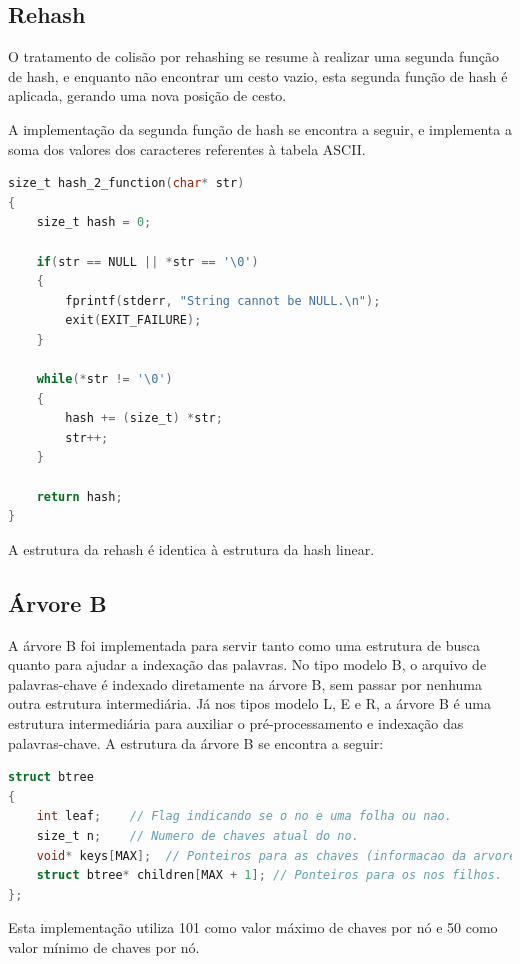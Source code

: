 \documentclass[a4paper,12pt]{article}
\begin{document}
\subsection{Rehash}
O tratamento de colisão por rehashing se resume à realizar uma segunda função de hash, e enquanto não encontrar um cesto vazio, 
esta segunda função de hash é aplicada, gerando uma nova posição de cesto.

A implementação da segunda função de hash se encontra a seguir, e implementa a soma dos valores dos caracteres referentes à tabela ASCII.

\begin{lstlisting}[language=C, caption=Segunda função de Hash]
size_t hash_2_function(char* str)
{
	size_t hash = 0;

	if(str == NULL || *str == '\0')
	{
		fprintf(stderr, "String cannot be NULL.\n");
		exit(EXIT_FAILURE);
	}

	while(*str != '\0')
	{
		hash += (size_t) *str;
		str++;
	}

	return hash;
}
\end{lstlisting}


A estrutura da rehash é identica à estrutura da hash linear.



\subsection{Árvore B}

A árvore B foi implementada para servir tanto como uma estrutura de busca quanto para ajudar a indexação das palavras.
No tipo modelo B, o arquivo de palavras-chave é indexado diretamente na árvore B, sem passar por nenhuma outra estrutura intermediária.
Já nos tipos modelo L, E e R, a árvore B é uma estrutura intermediária para auxiliar o pré-processamento e indexação das palavras-chave.
A estrutura da árvore B se encontra a seguir:

\begin{lstlisting}[language=C, caption=Estrutura da Árvore B]
struct btree
{
	int leaf;    // Flag indicando se o no e uma folha ou nao. 
	size_t n;    // Numero de chaves atual do no. 
	void* keys[MAX];  // Ponteiros para as chaves (informacao da arvore). 
	struct btree* children[MAX + 1]; // Ponteiros para os nos filhos. 
};
\end{lstlisting}

Esta implementação utiliza 101 como valor máximo de chaves por nó e 50 como valor mínimo de chaves por nó.
\end{document}
